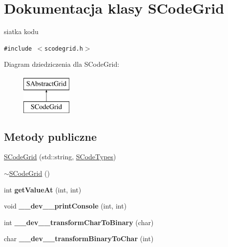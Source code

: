 \hypertarget{classSCodeGrid}{
\section{Dokumentacja klasy SCodeGrid}
\label{classSCodeGrid}
}
siatka kodu  


{\tt \#include $<$scodegrid.h$>$}

Diagram dziedziczenia dla SCodeGrid:\begin{figure}[H]
\begin{center}
\leavevmode
\includegraphics[height=2cm]{classSCodeGrid}
\end{center}
\end{figure}
\subsection*{Metody publiczne}
\begin{CompactItemize}
\item 
\hyperlink{classSCodeGrid_e430762ac9855cd60f8d5a57c46428b9}{SCodeGrid} (std::string, \hyperlink{senums_8h_1a2ae45552936d27425f99e1c187b043}{SCodeTypes})
\item 
\hyperlink{classSCodeGrid_c150afdd8f27785b5ddf5669a4d90332}{$\sim$SCodeGrid} ()
\item 
\hypertarget{classSCodeGrid_c57d52a49a55c91068fe0eb541e721f8}{
int \textbf{getValueAt} (int, int)}
\label{classSCodeGrid_c57d52a49a55c91068fe0eb541e721f8}

\item 
\hypertarget{classSCodeGrid_c01feeae87539b97aed07d67b975f174}{
void \textbf{\_\-\_\-dev\_\-\_\-printConsole} (int, int)}
\label{classSCodeGrid_c01feeae87539b97aed07d67b975f174}

\item 
\hypertarget{classSCodeGrid_c5754181e1266e23935d84f3beeb5979}{
int \textbf{\_\-\_\-dev\_\-\_\-transformCharToBinary} (char)}
\label{classSCodeGrid_c5754181e1266e23935d84f3beeb5979}

\item 
\hypertarget{classSCodeGrid_75d1d340ee3c5704527e793f2e71e93b}{
char \textbf{\_\-\_\-dev\_\-\_\-transformBinaryToChar} (int)}
\label{classSCodeGrid_75d1d340ee3c5704527e793f2e71e93b}

\end{CompactItemize}
